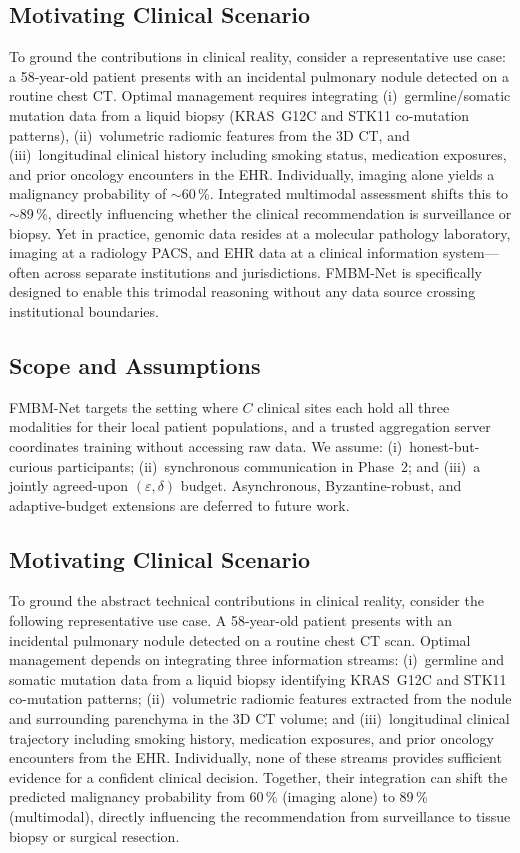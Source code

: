 \documentclass[a4paper,fleqn]{cas-dc}
\begin{document}
\subsection{Motivating Clinical Scenario}

To ground the contributions in clinical reality, consider a representative use case: a 58-year-old patient presents with an incidental pulmonary nodule detected on a routine chest CT. Optimal management requires integrating
(i)~germline/somatic mutation data from a liquid biopsy
(KRAS~G12C and STK11 co-mutation patterns),
(ii)~volumetric radiomic features from the 3D CT, and
(iii)~longitudinal clinical history including smoking status, medication
exposures, and prior oncology encounters in the EHR. Individually, imaging alone yields a malignancy probability of $\sim$60\,\%. Integrated multimodal assessment shifts this to $\sim$89\,\%, directly influencing whether the clinical recommendation is surveillance or biopsy. Yet in practice, genomic data resides at a molecular pathology laboratory, imaging at a radiology PACS, and EHR data at a clinical information system---often across separate
institutions and jurisdictions. FMBM-Net is specifically designed to enable this trimodal reasoning without any data source crossing institutional boundaries.

\subsection{Scope and Assumptions}

FMBM-Net targets the setting where $C$ clinical sites each hold all three modalities for their local patient populations, and a trusted aggregation server coordinates training without accessing raw data. We assume:
(i)~honest-but-curious participants; (ii)~synchronous communication in
Phase~2; and (iii)~a jointly agreed-upon $(\varepsilon,\delta)$ budget.
Asynchronous, Byzantine-robust, and adaptive-budget extensions are deferred
to future work.

\subsection{Motivating Clinical Scenario}

To ground the abstract technical contributions in clinical reality, consider the following representative use case. A 58-year-old patient presents with an incidental pulmonary nodule detected on a routine chest CT scan. Optimal management depends on integrating three information streams: (i)~germline and
somatic mutation data from a liquid biopsy identifying KRAS~G12C and STK11
co-mutation patterns; (ii)~volumetric radiomic features extracted from the
nodule and surrounding parenchyma in the 3D CT volume; and (iii)~longitudinal
clinical trajectory including smoking history, medication exposures, and prior oncology encounters from the EHR. Individually, none of these streams provides sufficient evidence for a confident clinical decision. Together, their integration can shift the predicted malignancy probability from 60\,\% (imaging alone) to 89\,\% (multimodal), directly influencing the recommendation from surveillance to tissue biopsy or surgical resection.
\end{document}
